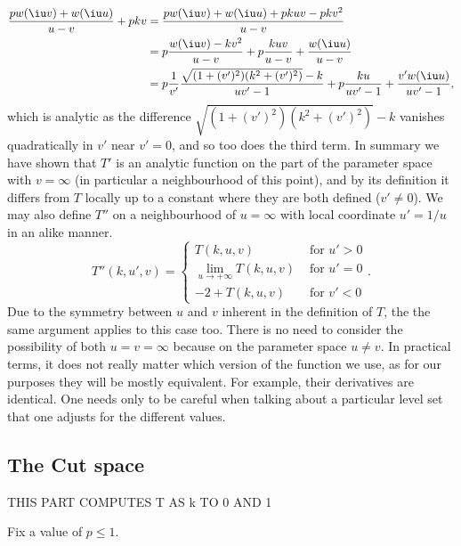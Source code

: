\begin{align}
\frac{p w(\iu v) + w(\iu u)}{u-v} + p k v
&= \frac{pw(\iu v) + w(\iu u) + pkuv - pkv^2}{u-v} \\
&= p \frac{w(\iu v) - kv^2}{u-v} + p \frac{kuv}{u-v} + \frac{w(\iu u)}{u-v} \\
&= p \frac{1}{v'}\frac{\sqrt{(1+(v')^2)(k^2 + (v')^2)} - k }{uv'-1} + p \frac{ku}{uv'-1} + \frac{v' w(\iu u)}{uv'-1},
\end{align}
which is analytic as the difference $\sqrt{(1+(v')^2)(k^2 + (v')^2)} - k$ vanishes quadratically in $v'$ near $v'=0$, and so too does the third term. In summary we have shown that $T'$ is an analytic function on the part of the parameter space with $v=\infty$ (in particular a neighbourhood of this point), and by its definition it differs from $T$ locally up to a constant where they are both defined ($v' \neq 0$). We may also define $T''$ on a neighbourhood of $u = \infty$ with local coordinate $u' = 1/u$ in an alike manner.
\[
T''(k,u',v) =
\begin{cases}
T(k,u, v) & \text{ for } u' > 0 \\
\lim_{u\to +\infty} T(k,u,v) & \text{ for } u' = 0 \\
-2 + T(k,u, v) & \text{ for } v' < 0
\end{cases}.
\]
Due to the symmetry between $u$ and $v$ inherent in the definition of $T$, the the same argument applies to this case too. There is no need to consider the possibility of both $u=v=\infty$ because on the parameter space $u\neq v$. In practical terms, it does not really matter which version of the function we use, as for our purposes they will be mostly equivalent. For example, their derivatives are identical. One needs only to be careful when talking about a particular level set that one adjusts for the different values.















\subsection{The Cut space}
THIS PART COMPUTES T AS k TO 0 AND 1

Fix a value of $p \leq 1$.

